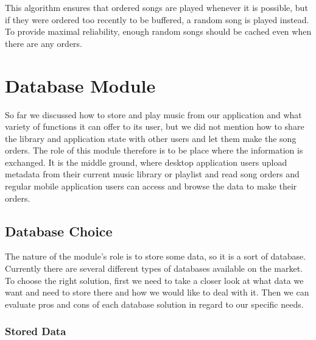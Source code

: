 This algorithm ensures that ordered songs are played whenever it is possible, but if they were ordered too recently to be buffered, a random song is played instead. To provide maximal reliability, enough random songs should be cached even when there are any orders.

\section {Database Module}

So far we discussed how to store and play music from our application and what variety of functions it can offer to its user, but we did not mention how to share the library and application state with other users and let them make the song orders. The role of this module therefore is to be place where the information is exchanged. It is the middle ground, where desktop application users upload metadata from their current music library or playlist and read song orders and regular mobile application users can access and browse the data to make their orders.

\subsection{Database Choice}

The nature of the module's role is to store some data, so it is a sort of database. Currently there are several different types of databases available on the market. To choose the right solution, first we need to take a closer look at what data we want and need to store there and how we would like to deal with it. Then we can evaluate pros and cons of each database solution in regard to our specific needs.

\subsubsection{Stored Data}

